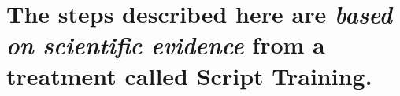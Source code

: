 \documentclass[
]{book}
\begin{document}
\hypertarget{the-steps-described-here-are-based-on-scientific-evidence-from-a-treatment-called-script-training.}{%
\section{\texorpdfstring{The steps described here are \emph{based on scientific evidence} from a treatment called Script Training.}{The steps described here are based on scientific evidence from a treatment called Script Training.}}\label{the-steps-described-here-are-based-on-scientific-evidence-from-a-treatment-called-script-training.}}

  
\end{document}
